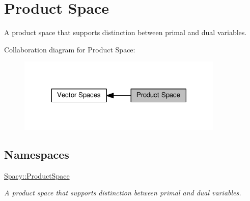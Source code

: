 \hypertarget{group__ProductSpaceGroup}{}\section{Product Space}
\label{group__ProductSpaceGroup}


A product space that supports distinction between primal and dual variables.  


Collaboration diagram for Product Space\+:\nopagebreak
\begin{figure}[H]
\begin{center}
\leavevmode
\includegraphics[width=278pt]{group__ProductSpaceGroup}
\end{center}
\end{figure}
\subsection*{Namespaces}
\begin{DoxyCompactItemize}
\item 
 \hyperlink{namespaceSpacy_1_1ProductSpace}{Spacy\+::\+Product\+Space}
\begin{DoxyCompactList}\small\item\em A product space that supports distinction between primal and dual variables. \end{DoxyCompactList}\end{DoxyCompactItemize}
